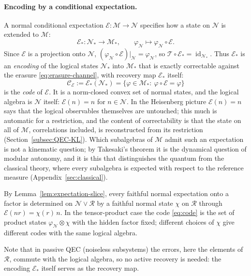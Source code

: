 \documentclass[a4paper,11pt]{article}
\theoremstyle{definition}
\newcommand{\mR}{\mathcal{R}}
\newcommand{\mN}{\mathcal{N}}
\newcommand{\mM}{\mathcal{M}}
\newcommand{\mE}{\mathcal{E}}
\begin{document}
\paragraph{Encoding by a conditional expectation.}
A normal conditional expectation $\mE:\mM\to\mN$ specifies how a state on $\mN$ is extended to $\mM$:
\begin{equation}
 \mE_*:\mN_*\to\mM_*,\qquad \varphi_{\mN}\mapsto\varphi_{\mN}\circ\mE .
 \label{eq:encoding}
\end{equation}
Since $\mE$ is a projection onto $\mN$, $(\varphi_{\mN}\circ\mE)|_{\mN}=\varphi_{\mN}$, so $\mathcal T\circ\mE_*=\operatorname{id}_{\mN_*}$. Thus $\mE_*$ is an \emph{encoding} of the logical states $\mN_*$ into $\mM_*$ that is exactly correctable against the erasure \eqref{eq:erasure-channel}, with recovery map $\mE_*$ itself:
\begin{equation}
 \mathcal C_{\mE}:=\mE_*(\mN_*)=\{\varphi\in\mM_*:\ \varphi\circ\mE=\varphi\}
 \label{eq:code}
\end{equation}
is the \emph{code} of $\mE$. It is a norm-closed convex set of normal states, and the logical algebra is $\mN$ itself: $\mE(n)=n$ for $n\in\mN$. In the Heisenberg picture $\mE(n)=n$ says that the logical observables themselves are untouched; this much is automatic for a restriction, and the content of correctability is that the state on all of $\mM$, correlations included, is reconstructed from its restriction (Section~\ref{subsec:QEC-KL}). Which subalgebras of $\mM$ admit such an expectation is not a kinematic question; by Takesaki's theorem it is the dynamical question of modular autonomy, and it is this that distinguishes the quantum from the classical theory, where every subalgebra is expected with respect to the reference measure (Appendix~\ref{sec:classical}).

By Lemma~\ref{lem:expectation-slice}, every faithful normal expectation onto a factor is determined on $\mN\vee\mR$ by a faithful normal state $\chi$ on $\mR$ through $\mE(nr)=\chi(r)\,n$. In the tensor-product case the code \eqref{eq:code} is the set of product states $\varphi_{\mN}\otimes\chi$ with the hidden factor fixed; different choices of $\chi$ give different codes with the same logical algebra. 

Note that in passive QEC (noiseless subsystems) the errors, here the elements of $\mR$, commute with the logical algebra, so no active recovery is needed: the encoding $\mE_*$ itself serves as the recovery map.
\end{document}
